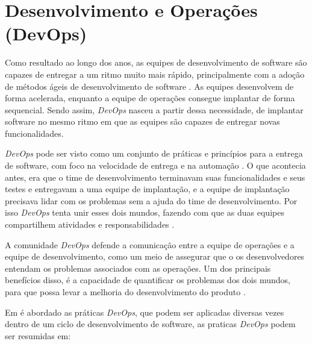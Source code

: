 \section{Desenvolvimento e Operações (DevOps)}
\label{subsec:DevOps}
Como resultado ao longo dos anos, as equipes de desenvolvimento de software
são capazes de entregar a um ritmo muito mais rápido, principalmente com a adoção
de métodos ágeis de desenvolvimento de software \cite{7173368}. As 
equipes desenvolvem de forma acelerada, enquanto a equipe de operações consegue 
implantar de forma sequencial. Sendo assim, \textit{DevOps}
nasceu a partir dessa necessidade, de implantar software no mesmo ritmo em que
as equipes são capazes de entregar novas funcionalidades.

\textit{DevOps} pode ser visto como um conjunto de práticas e princípios para a 
entrega de software, com foco na velocidade de entrega e na automação \cite{7173368}. 
O que acontecia antes, era que o time de desenvolvimento terminavam suas funcionalidades e seus testes e
entregavam a uma equipe de implantação, e a equipe de implantação precisava
lidar com os problemas sem a ajuda do time de desenvolvimento. Por isso \textit{DevOps} 
tenta unir esses dois mundos, fazendo com que as duas equipes compartilhem atividades
 e responsabilidades \cite{6265084}.

A comunidade \textit{DevOps} defende a comunicação
entre a equipe de operações e a equipe de desenvolvimento, como um meio de assegurar
que o os desenvolvedores entendam os problemas associados com as operações. Um dos
principais benefícios disso, é a capacidade de quantificar os problemas dos dois mundos,
para que possa levar a melhoria do desenvolvimento do produto \cite{httermann2012DevOps}.

Em  é abordado as práticas \textit{DevOps}, que podem ser 
aplicadas diversas vezes dentro de um ciclo de desenvolvimento de software, as 
praticas \textit{DevOps} podem ser resumidas em:

